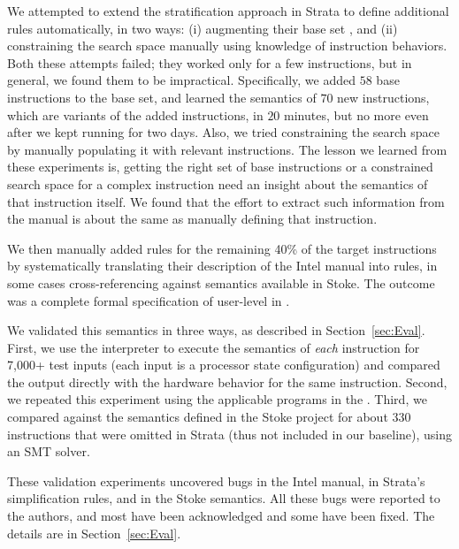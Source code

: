 We attempted to extend the stratification approach in Strata to define additional rules automatically, in two ways: (i) augmenting their base set , and (ii) constraining the search space manually using knowledge of instruction behaviors.  Both these attempts failed; they worked only for a few instructions, but in general, we found them to be impractical. Specifically, we added $58$ base instructions to the base set, and learned the semantics of $70$ new instructions, which are variants of the added  instructions, in $20$ minutes, but no more even after we kept running for two days. Also, we tried constraining the search space by manually populating it with relevant instructions. The lesson we learned from these experiments is, getting the right set of base instructions or a constrained search space for a complex instruction need an insight about the semantics of that instruction itself. We found that the effort to extract such information from the manual is about the same  as manually defining that instruction.
 


We then manually added \K rules for the remaining 40\% of the target instructions by systematically translating their description of the Intel manual into \K rules, in some cases cross-referencing against semantics available in Stoke.
%
The outcome was a complete formal specification of user-level \ISA in \K.

We validated this semantics in three ways, as described in Section~\ref{sec:Eval}.
%
First, we use the \K interpreter to execute the semantics of \emph{each} instruction for 7,000+ test inputs (each input is a processor state configuration) and compared the output directly with the hardware behavior for the same instruction.
%
Second, we repeated this experiment using the applicable programs in the .  %
%
Third, we compared against the semantics defined in the Stoke project for about 330 instructions that were omitted in Strata (thus not included in our baseline), using an SMT solver.

These validation experiments uncovered bugs in the Intel manual, in Strata's simplification rules, and in the Stoke semantics.  All these bugs were reported to the authors, and most have been acknowledged and some have been fixed.  The details are in Section~\ref{sec:Eval}.


